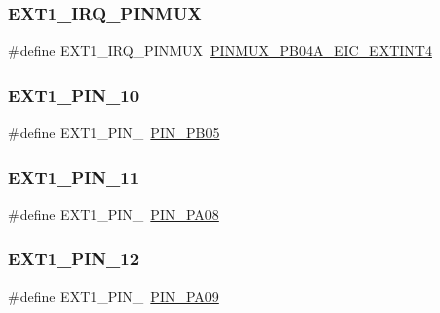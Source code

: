 \mbox{\label{group__samd21__xplained__pro__features__group_ga556d8241bd3ae14ae5397437a8e9c9d3}} 
\subsubsection{\texorpdfstring{EXT1\_IRQ\_PINMUX}{EXT1\_IRQ\_PINMUX}}
{\footnotesize\ttfamily \#define E\+X\+T1\+\_\+\+I\+R\+Q\+\_\+\+P\+I\+N\+M\+UX~\mbox{\hyperlink{pio_2samd21j18a_8h_ab4e046f51ad6b5fb50b32fb65616f6e6}{P\+I\+N\+M\+U\+X\+\_\+\+P\+B04\+A\+\_\+\+E\+I\+C\+\_\+\+E\+X\+T\+I\+N\+T4}}}

\mbox{\label{group__samd21__xplained__pro__features__group_gad2c2d06f0f2761bcc4c4448a233061f9}} 
\subsubsection{\texorpdfstring{EXT1\_PIN\_10}{EXT1\_PIN\_10}}
{\footnotesize\ttfamily \#define E\+X\+T1\+\_\+\+P\+I\+N\+\_~\mbox{\hyperlink{pio_2samd21j18a_8h_ae62ed501d1f5f6cdc6bf605742aeb778}{P\+I\+N\+\_\+\+P\+B05}}}

\mbox{\label{group__samd21__xplained__pro__features__group_gab0c46ea18840c81fc2257547f8af3c57}} 
\subsubsection{\texorpdfstring{EXT1\_PIN\_11}{EXT1\_PIN\_11}}
{\footnotesize\ttfamily \#define E\+X\+T1\+\_\+\+P\+I\+N\+\_~\mbox{\hyperlink{pio_2samd21j18a_8h_a7dc08bf81d9967156de18aae2cb5fe46}{P\+I\+N\+\_\+\+P\+A08}}}

\mbox{\label{group__samd21__xplained__pro__features__group_ga7e54c69b2687572b6477c1618f0a9269}} 
\subsubsection{\texorpdfstring{EXT1\_PIN\_12}{EXT1\_PIN\_12}}
{\footnotesize\ttfamily \#define E\+X\+T1\+\_\+\+P\+I\+N\+\_~\mbox{\hyperlink{pio_2samd21j18a_8h_ac14663d14647a4a629d8dc37616bf7e4}{P\+I\+N\+\_\+\+P\+A09}}}

